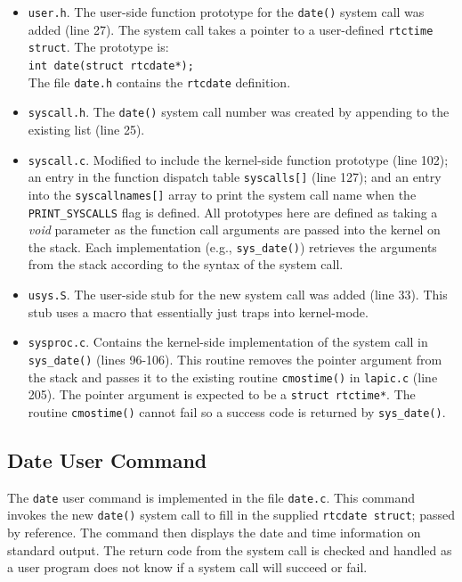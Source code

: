 \documentclass[11pt,letterpaper]{report}
\begin{document}
	\begin{itemize}

	\item {\tt user.h}. The user-side function prototype for the {\tt date()} system call was added (line 27). The system call takes a pointer to a user-defined {\tt rtctime struct}. The prototype is:\\
	{\tt int date(struct rtcdate*);} \\
	The file {\tt date.h} contains the {\tt rtcdate} definition.
	
	\item {\tt syscall.h}. The {\tt date()} system call number was created by appending to the existing list (line 25).
	
	\item {\tt syscall.c}. Modified to include the kernel-side function prototype (line 102); an entry in the function dispatch table {\tt syscalls[]} (line 127); and an entry into the {\tt syscallnames[]} array to print the system call name when the {\tt PRINT\_SYSCALLS} flag is defined. All prototypes here are defined as taking a \emph{void} parameter as the function call arguments are passed into the kernel on the stack. Each implementation (e.g., {\tt sys\_date()})  retrieves the arguments from the stack according to the syntax of the system call.
	
	\item {\tt usys.S}. The user-side stub for the new system call was added (line 33). This stub uses a macro that essentially just traps into kernel-mode.
	
	\item {\tt sysproc.c}. Contains the kernel-side implementation  of the system call in {\tt sys\_date()} (lines 96-106). This routine removes the pointer argument from the stack and passes it to the existing routine {\tt cmostime()} in {\tt lapic.c} (line 205). The pointer argument is expected to be a {\tt struct rtctime*}. The routine {\tt cmostime()} cannot fail so a success code is returned by {\tt sys\_date()}.
	
	\end{itemize}
	
	\subsection*{Date User Command}
	The {\tt date} user command is implemented in the file {\tt date.c}. This command invokes the new {\tt date()} system call to fill in the supplied {\tt rtcdate struct}; passed by reference. The command then displays the date and time information on standard output. The return code from the system call is checked and handled as a user program does not know if a system call will succeed or fail. \\
			
\end{document}
